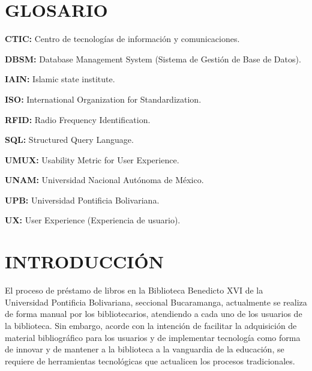 \documentclass[spanish]{ieee_upb}
\begin{document}
\newpage
\section*{GLOSARIO}
\textbf{CTIC: } Centro de tecnologías de información y comunicaciones.

\vspace{0.1cm}
\textbf{DBSM: } Database Management System (Sistema de Gestión de Base de Datos).

\vspace{0.1cm}
\textbf{IAIN: } Islamic state institute.

\vspace{0.1cm}
\textbf{ISO: } International Organization for Standardization.

\vspace{0.1cm}
\textbf{RFID: } Radio Frequency Identification.

\vspace{0.1cm}
\textbf{SQL: } Structured Query Language. 

\vspace{0.1cm}
\textbf{UMUX: } Usability Metric for User Experience.

\vspace{0.1cm}
\textbf{UNAM: } Universidad Nacional Autónoma de México.

\vspace{0.1cm}
\textbf{UPB: } Universidad Pontificia Bolivariana.

\vspace{0.1cm}
\textbf{UX: } User Experience (Experiencia de usuario).



\newpage
\section{INTRODUCCIÓN}
El proceso de préstamo de libros en la Biblioteca Benedicto XVI de la Universidad Pontificia Bolivariana, seccional Bucaramanga, actualmente se realiza de forma manual por los bibliotecarios, atendiendo a cada uno de los usuarios de la biblioteca. Sin embargo, acorde con la intención de facilitar la adquisición de material bibliográfico para los usuarios y de implementar tecnología como forma de innovar y de mantener a la biblioteca a la vanguardia de la educación, se requiere de herramientas tecnológicas que actualicen los procesos tradicionales.
\vspace{0.3 cm}
\end{document}
